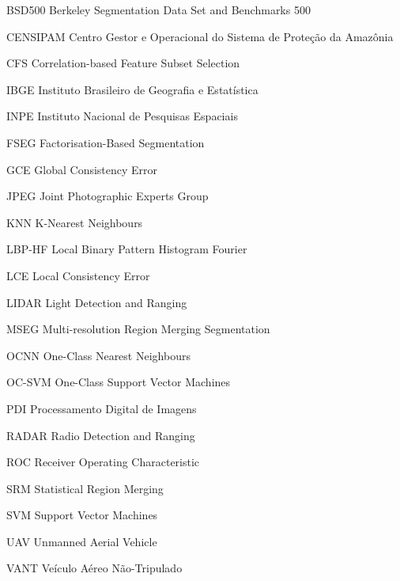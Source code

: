 \tableofcontents*
\clearpage

\listoffigures
\clearpage

\listoftables
\clearpage

\begin{siglas}
	\item[BSD500] Berkeley Segmentation Data Set and Benchmarks 500
	\item[CENSIPAM] Centro Gestor e Operacional do Sistema de Proteção da Amazônia
	\item[CFS] Correlation-based Feature Subset Selection
	\item[IBGE] Instituto Brasileiro de Geografia e Estatística
	\item[INPE] Instituto Nacional de Pesquisas Espaciais
	\item[FSEG] Factorisation-Based Segmentation
	\item[GCE] Global Consistency Error
	\item[JPEG] Joint Photographic Experts Group
	\item[KNN] K-Nearest Neighbours
	\item[LBP-HF] Local Binary Pattern Histogram Fourier
	\item[LCE] Local Consistency Error
	\item[LIDAR] Light Detection and Ranging
	\item[MSEG] Multi-resolution Region Merging Segmentation
	\item[OCNN] One-Class Nearest Neighbours
	\item[OC-SVM] One-Class Support Vector Machines
	\item[PDI] Processamento Digital de Imagens
	\item[RADAR] Radio Detection and Ranging
	\item[ROC] Receiver Operating Characteristic
	\item[SRM] Statistical Region Merging
	\item[SVM] Support Vector Machines
	\item[UAV] Unmanned Aerial Vehicle
	\item[VANT] Veículo Aéreo Não-Tripulado
\end{siglas}


